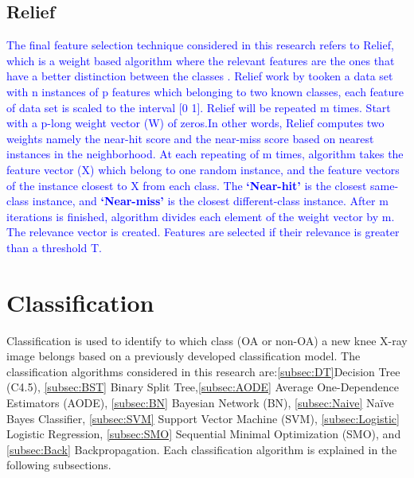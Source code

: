 \documentclass[review]{elsarticle}
\begin{document}
\subsection{Relief}
\label{subsec:Relief}
\textcolor{blue}{
The final feature selection technique considered in this research refers to Relief, which is a weight based algorithm where the relevant features are the ones that have a better distinction between the classes \cite{Kira1994}. Relief work by tooken a data set with n instances of p features which belonging to two known classes, each feature of data set is scaled to the interval [0 1]. Relief will be repeated m times. Start with a p-long weight vector (W) of zeros.In other words, Relief computes two weights namely the near-hit score and the near-miss score based on nearest instances in the neighborhood.
At each repeating of m times, algorithm takes the feature vector (X) which belong to one random instance, and the feature vectors of the instance closest to X  from each class. The \textbf{\lq Near-hit\rq} is the closest same-class instance, and \textbf{\lq Near-miss\rq} is the closest different-class instance. After m iterations is finished, algorithm divides each element of the weight vector by m. The relevance vector is created. Features are selected if their relevance is greater than a threshold T. }

 
\section{Classification}

Classification is used to identify to which class (OA or non-OA) a new knee X-ray image belongs based on a previously developed classification model. The classification algorithms considered in this research are:\ref{subsec:DT}Decision Tree (C4.5), \ref{subsec:BST} Binary Split Tree,\ref{subsec:AODE} Average One-Dependence Estimators (AODE), \ref{subsec:BN} Bayesian Network (BN), \ref{subsec:Naive} Na\"ive Bayes Classifier, \ref{subsec:SVM} Support Vector Machine (SVM), \ref{subsec:Logistic} Logistic Regression, \ref{subsec:SMO} Sequential Minimal Optimization (SMO), and \ref{subsec:Back} Backpropagation. Each classification algorithm is explained in the following subsections.
\end{document}
